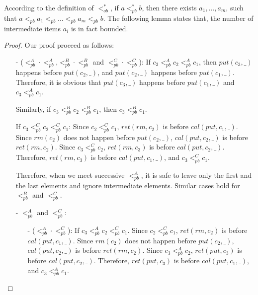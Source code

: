 


According to the definition of $<_{\textit{ob}}^*$, if $a <_{\textit{pb}}^* b$, then there exists $a_1,\ldots,a_m$, such that $a <_{\textit{pb}} a_1 <_{\textit{pb}} \ldots <_{\textit{pb}} a_m <_{\textit{pb}} b$. The following lemma states that, the number of intermediate items $a_i$ is in fact bounded.

\OBOrderHasBoundedLength*

\begin {proof}

Our proof proceed as follows:

\begin{itemize}
\setlength{\itemsep}{0.5pt}
\item[-] ($<_{\textit{pb}}^A \cdot <_{\textit{pb}}^A$,$<_{\textit{pb}}^B \cdot <_{\textit{pb}}^B$ and $<_{\textit{pb}}^C \cdot <_{\textit{pb}}^C$): If $c_3 <_{\textit{pb}}^A c_2 <_{\textit{pb}}^A c_1$, then $\textit{put}(c_3,\_)$ happens before $\textit{put}(c_2,\_)$, and $\textit{put}(c_2,\_)$ happens before $\textit{put}(c_1,\_)$. Therefore, it is obvious that $\textit{put}(c_3,\_)$ happens before $\textit{put}(c_1,\_)$ and $c_3 <_{\textit{pb}}^A c_1$.

    Similarly, if $c_3 <_{\textit{pb}}^B c_2 <_{\textit{pb}}^B c_1$, then $c_3 <_{\textit{pb}}^B c_1$.

    If $c_3 <_{\textit{pb}}^C c_2 <_{\textit{pb}}^C c_1$: Since $c_2 <_{\textit{pb}}^C c_1$, $\textit{ret}(\textit{rm},c_2)$ is before $\textit{cal}(\textit{put},c_1,\_)$. Since $\textit{rm}(c_2)$ does not happen before $\textit{put}(c_2,\_)$, $\textit{cal}(\textit{put},c_2,\_)$ is before $\textit{ret}(\textit{rm},c_2)$. Since $c_3 <_{\textit{pb}}^C c_2$, $\textit{ret}(\textit{rm},c_3)$ is before $\textit{cal}(\textit{put},c_2,\_)$. Therefore, $\textit{ret}(\textit{rm},c_3)$ is before $\textit{cal}(\textit{put},c_1,\_)$, and $c_3 <_{\textit{pb}}^C c_1$.

    Therefore, when we meet successive $<_{\textit{pb}}^A$, it is safe to leave only the first and the last elements and ignore intermediate elements. Similar cases hold for $<_{\textit{pb}}^B$ and $<_{\textit{pb}}^C$.

\item[-] $<_{\textit{pb}}^A$ and $<_{\textit{pb}}^C$:

    \begin{itemize}
    \setlength{\itemsep}{0.5pt}
    \item[-] ($<_{\textit{pb}}^A \cdot <_{\textit{pb}}^C$): If $c_3 <_{\textit{pb}}^A c_2 <_{\textit{pb}}^C c_1$. Since $c_2 <_{\textit{pb}}^C c_1$, $\textit{ret}(\textit{rm},c_2)$ is before $\textit{cal}(\textit{put},c_1,\_)$. Since $\textit{rm}(c_2)$ does not happen before $\textit{put}(c_2,\_)$, $\textit{cal}(\textit{put},c_2,\_)$ is before $\textit{ret}(\textit{rm},c_2)$. Since $c_3 <_{\textit{pb}}^A c_2$, $\textit{ret}(\textit{put},c_3)$ is before $\textit{cal}(\textit{put},c_2,\_)$. Therefore, $\textit{ret}(\textit{put},c_3)$ is before $\textit{cal}(\textit{put},c_1,\_)$, and $c_3 <_{\textit{pb}}^A c_1$.


\end{itemize}
\end{itemize}
\end{proof}
